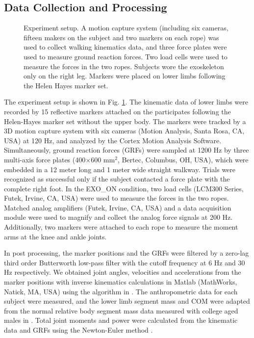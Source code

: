 \documentclass[10pt]{asme2ej}
\begin{document}
\subsection{Data Collection and Processing}

\begin{figure}[bt]
	\caption{Experiment setup.
	A motion capture system (including six cameras, fifteen makers on the subject and two markers on each rope) was used to collect walking kinematics data, and three force plates were used to measure ground reaction forces.
	Two load cells were used to measure the forces in the two ropes.
	Subjects wore the exoskeleton only on the right leg.
	Markers were placed on lower limbs following the Helen Hayes marker set.}
	\label{fig:Environment}
\end{figure}

The experiment setup is shown in Fig. \ref{fig:Environment}.
The kinematic data of lower limbs were recorded by 15 reflective markers attached on the participates following the Helen-Hayes marker set \cite{RN24} without the upper body.
The markers were tracked by a 3D motion capture system with six cameras (Motion Analysis, Santa Rosa, CA, USA) at 120 Hz, and analyzed by the Cortex Motion Analysis Software.
Simultaneously, ground reaction forces (GRFs) were sampled at 1200 Hz by three multi-axis force plates (400$\times$600 mm$^{2}$, Bertec, Columbus, OH, USA), which were embedded in a 12 meter long and 1 meter wide straight walkway.
Trials were recognized as successful only if the subject contacted a force plate with the complete right foot.
In the EXO\_ON condition, two load cells (LCM300 Series, Futek, Irvine, CA, USA) were used to measure the forces in the two ropes.
Matched analog amplifiers (Futek, Irvine, CA, USA) and a data acquisition module were used to magnify and collect the analog force signals at 200 Hz.
Additionally, two markers were attached to each rope to measure the moment arms at the knee and ankle joints.

In post processing, the marker positions and the GRFs were filtered by a zero-lag third order Butterworth low-pass filter with the cutoff frequency at 6 Hz and 30 Hz respectively.
We obtained joint angles, velocities and accelerations from the marker positions with inverse kinematics calculations in Matlab (MathWorks, Natick, MA, USA) using the algorithm in \cite{RN24}.
The anthropometric data for each subject were measured, and the lower limb segment mass and COM were adapted from the normal relative body segment mass data measured with college aged males in \cite{de1996adjustments}.
Total joint moments and power were calculated from the kinematic data and GRFs using the Newton-Euler method \cite{kane1985dynamics}.
\end{document}
